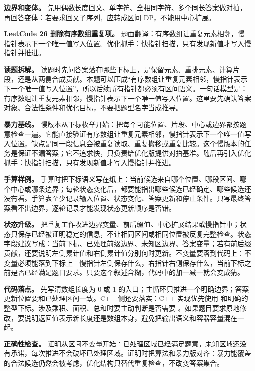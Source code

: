 \textbf{边界和变体。} 先用偶数长度回文、单字符、全相同字符、多个同长答案做对拍，再回答变体：若要求回文子序列，应转成区间 DP，不能用中心扩展。

\noindent\textbf{LeetCode 26 删除有序数组重复项。} 题面翻译：有序数组让重复元素相邻，慢指针表示下一个唯一值写入位置。优化抓手：快指针扫描，只有发现新值才写入慢指针并推进。

\textbf{读题拆解。} 读题时先问答案落在哪些下标上，是保留元素、重排元素、计算片段，还是从两侧合成贡献。本题可以压成“有序数组让重复元素相邻，慢指针表示下一个唯一值写入位置”，所以后续所有指针都必须有区间语义。一句话模型是：有序数组让重复元素相邻，慢指针表示下一个唯一值写入位置。这里要先确认答案对象、合法性条件和优化目标，不要把题型名字当成推导。

\textbf{暴力基线。} 慢版本从下标枚举开始：把每个可能位置、片段、中心或边界都按题意检查一遍。它能直接验证有序数组让重复元素相邻，慢指针表示下一个唯一值写入位置，缺点是同一段信息会被重复读取、重复搬移或重复比较。这个慢版本的任务是保证不漏答案；它不追求快，只负责给优化版提供对拍基准。随后再引入优化抓手：快指针扫描，只有发现新值才写入慢指针并推进。

\textbf{手算样例。} 手算时把下标语义写在纸上：当前候选来自哪个位置、哪段区间、哪个中心或哪条边界；每轮状态变化后，都要能指出哪些候选已经确定、哪些候选还没有看。手算表至少记录输入位置、状态变化、答案更新和停止条件。只写最终答案看不出边界，逐轮记录才能发现状态更新顺序是否错。

\textbf{状态升级。} 把重复工作收进边界变量、前后缀值、中心扩展结果或慢指针中；状态只保存已经被证明稳定的信息，不让相同区间或相同位置被反复完整检查。状态字段建议写成：当前下标、已处理前缀边界、未知区边界、答案变量；若有前后缀贡献，还要说明左侧累计值和右侧累计值分别何时更新。不变量要落到代码上：不变量必须能落到下标上：慢指针左侧保存什么，右指针右侧保存什么，当前下标之前是否已经满足题目要求。只要这个叙述含糊，代码中的加一减一就会变成猜。

\textbf{代码落点。} 先写清数组长度为 0 或 1 的入口；主循环只推进一个明确边界；答案更新位置要和已处理区间一致。C++ 侧还要落实：C++ 实现优先使用  和明确的整型下标。涉及乘积、面积、总和时要主动判断是否需要 。如果题目要求原地修改，要说明返回值表示新长度还是数组本身，避免把输出语义和容器容量混在一起。

\textbf{正确性检查。} 证明从区间不变量开始：已处理区域已经满足题意，未知区域还没有承诺，每次推进不会破坏已处理区域。证明时把算法和暴力版对齐：暴力能覆盖的合法候选仍然会被考虑，优化结构只替代重复检查，不改变答案集合。

